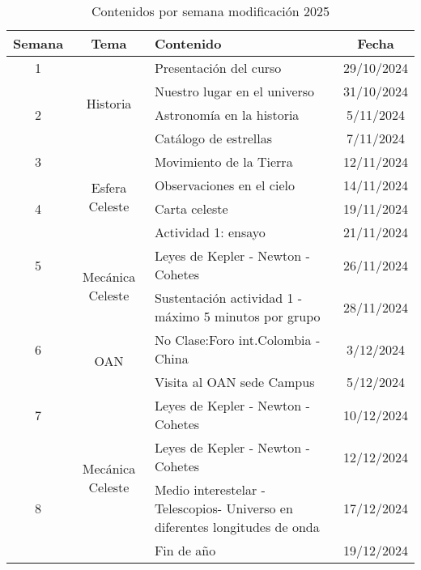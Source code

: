 \documentclass[12pt]{article}
\begin{document}
\begin{table}[p]
    \centering
    \caption{Contenidos por semana modificación 2025}
    \renewcommand{\arraystretch}{1.2} %
    \begin{tabular}{|c|c|p{20em}|c|}
        \hline
        \textbf{Semana} & \textbf{Tema} & \textbf{Contenido} & \textbf{Fecha} \\
        \hline
        1  & \multirow{4}{*}{Historia} & Presentación del curso & 29/10/2024 \\
           &                           & Nuestro lugar en el universo & 31/10/2024 \\
        \cline{1-1}\cline{3-4}    2  &                           & Astronomía en la historia & 5/11/2024 \\
           &                           & Catálogo de estrellas & 7/11/2024 \\
        \hline
        3  & \multirow{4}{*}{Esfera Celeste} & Movimiento de la Tierra & 12/11/2024 \\
           &                           & Observaciones en el cielo & 14/11/2024 \\
        \cline{1-1}\cline{3-4}    4  &                           & Carta celeste & 19/11/2024 \\
           &                           & Actividad 1: ensayo & 21/11/2024 \\
        \hline
       5  & \multirow{2}{*}{Mecánica Celeste} & Leyes de Kepler - Newton - Cohetes & 26/11/2024 \\
          &                           & \cellcolor[rgb]{ .651,  .788,  .925}Sustentación actividad 1 - máximo 5 minutos por grupo & 28/11/2024 \\
       \hline
       6  & \multirow{2}{*}{OAN} & No Clase:Foro int.Colombia - China & 3/12/2024 \\
          &                           & \cellcolor[rgb]{ .651,  .788,  .925}Visita al OAN sede Campus & 5/12/2024 \\
       \hline
       7  & \multirow{4}{*}{Mecánica Celeste} & Leyes de Kepler - Newton - Cohetes & 10/12/2024 \\
          &                           & Leyes de Kepler - Newton - Cohetes & 12/12/2024 \\
       \cline{1-1}\cline{3-4}    8  &                           & Medio interestelar - Telescopios- Universo en diferentes longitudes de onda & 17/12/2024 \\
          &                           & \cellcolor[rgb]{ .969,  .78,  .675}Fin de año & 19/12/2024 \\

\end{tabular}
\end{table}
\end{document}
